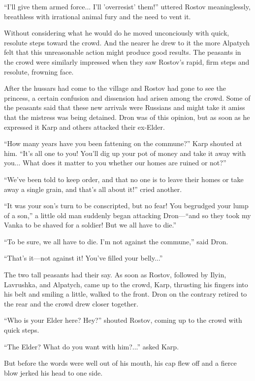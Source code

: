 ``I'll give them armed force... I'll 'overresist' them!'' uttered
Rostov meaninglessly, breathless with irrational animal fury and
the need to vent it.

Without considering what he would do he moved unconciously with
quick, resolute steps toward the crowd. And the nearer he drew to
it the more Alpatych felt that this unreasonable action might
produce good results.  The peasants in the crowd were similarly
impressed when they saw Rostov's rapid, firm steps and resolute,
frowning face.

After the hussars had come to the village and Rostov had gone to
see the princess, a certain confusion and dissension had arisen
among the crowd.  Some of the peasants said that these new
arrivals were Russians and might take it amiss that the mistress
was being detained. Dron was of this opinion, but as soon as he
expressed it Karp and others attacked their ex-Elder.

``How many years have you been fattening on the commune?'' Karp
shouted at him. ``It's all one to you! You'll dig up your pot of
money and take it away with you... What does it matter to you
whether our homes are ruined or not?''

``We've been told to keep order, and that no one is to leave
their homes or take away a single grain, and that's all about
it!'' cried another.

``It was your son's turn to be conscripted, but no fear! You
begrudged your lump of a son,'' a little old man suddenly began
attacking Dron---``and so they took my Vanka to be shaved for a
soldier! But we all have to die.''

``To be sure, we all have to die. I'm not against the commune,''
said Dron.

``That's it---not against it! You've filled your belly...''

The two tall peasants had their say. As soon as Rostov, followed
by Ilyin, Lavrushka, and Alpatych, came up to the crowd, Karp,
thrusting his fingers into his belt and smiling a little, walked
to the front.  Dron on the contrary retired to the rear and the
crowd drew closer together.

``Who is your Elder here? Hey?'' shouted Rostov, coming up to the
crowd with quick steps.

``The Elder? What do you want with him?...'' asked Karp.

But before the words were well out of his mouth, his cap flew off
and a fierce blow jerked his head to one side.

